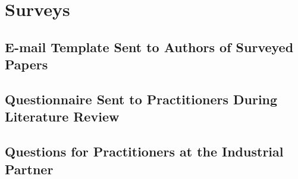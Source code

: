 \chapter{Surveys}\label{app:surveys}


\section{E-mail Template Sent to Authors of Surveyed Papers}
\label{sec:app_email}

\section{Questionnaire Sent to Practitioners During Literature Review}
\label{sec:app_prac_questionnaire}

\section{Questions for Practitioners at the Industrial Partner}
\label{sec:app_ind_questions}

